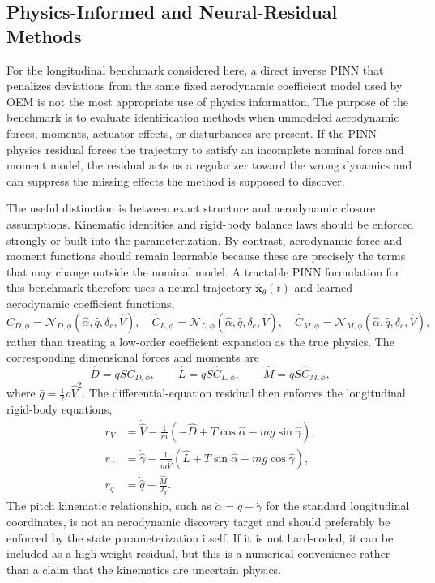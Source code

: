 \documentclass[11pt]{article}
\begin{document}
\subsection{Physics-Informed and Neural-Residual Methods}
For the longitudinal benchmark considered here, a direct inverse PINN that penalizes deviations from the same fixed aerodynamic coefficient model used by OEM is not the most appropriate use of physics information. The purpose of the benchmark is to evaluate identification methods when unmodeled aerodynamic forces, moments, actuator effects, or disturbances are present. If the PINN physics residual forces the trajectory to satisfy an incomplete nominal force and moment model, the residual acts as a regularizer toward the wrong dynamics and can suppress the missing effects the method is supposed to discover.

The useful distinction is between exact structure and aerodynamic closure assumptions. Kinematic identities and rigid-body balance laws should be enforced strongly or built into the parameterization. By contrast, aerodynamic force and moment functions should remain learnable because these are precisely the terms that may change outside the nominal model. A tractable PINN formulation for this benchmark therefore uses a neural trajectory $\widehat{\mathbf{x}}_\theta(t)$ and learned aerodynamic coefficient functions,
\[
\widehat{C}_{D,\phi}=\mathcal{N}_{D,\phi}(\widehat{\alpha},\widehat{q},\delta_e,\widehat{V}),\quad
\widehat{C}_{L,\phi}=\mathcal{N}_{L,\phi}(\widehat{\alpha},\widehat{q},\delta_e,\widehat{V}),\quad
\widehat{C}_{M,\phi}=\mathcal{N}_{M,\phi}(\widehat{\alpha},\widehat{q},\delta_e,\widehat{V}),
\]
rather than treating a low-order coefficient expansion as the true physics. The corresponding dimensional forces and moments are
\[
\widehat{D}=\bar{q}S\widehat{C}_{D,\phi},\qquad
\widehat{L}=\bar{q}S\widehat{C}_{L,\phi},\qquad
\widehat{M}=\bar{q}S\widehat{C}_{M,\phi},
\]
where $\bar{q}=\frac{1}{2}\rho \widehat{V}^2$. The differential-equation residual then enforces the longitudinal rigid-body equations,
\[
\begin{aligned}
r_V &= \dot{\widehat{V}}
 - \frac{1}{m}\left(-\widehat{D}+T\cos\widehat{\alpha}-mg\sin\widehat{\gamma}\right),\\
r_\gamma &= \dot{\widehat{\gamma}}
 - \frac{1}{m\widehat{V}}\left(\widehat{L}+T\sin\widehat{\alpha}-mg\cos\widehat{\gamma}\right),\\
r_q &= \dot{\widehat{q}}-\frac{\widehat{M}}{J_y}.
\end{aligned}
\]
The pitch kinematic relationship, such as $\dot{\alpha}=q-\dot{\gamma}$ for the standard longitudinal coordinates, is not an aerodynamic discovery target and should preferably be enforced by the state parameterization itself. If it is not hard-coded, it can be included as a high-weight residual, but this is a numerical convenience rather than a claim that the kinematics are uncertain physics.
\end{document}
